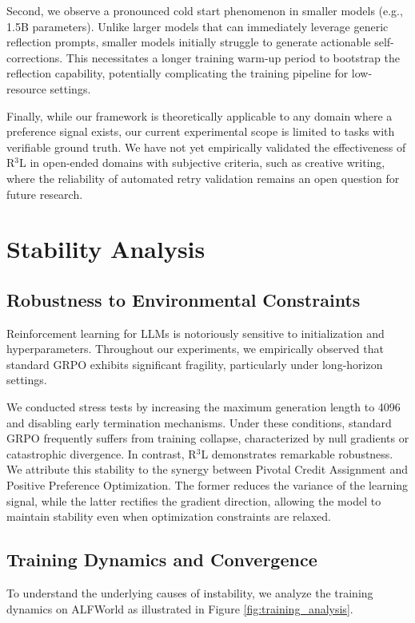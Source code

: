 \documentclass[11pt]{article}
\begin{document}
Second, we observe a pronounced cold start phenomenon in smaller models (e.g., 1.5B parameters). Unlike larger models that can immediately leverage generic reflection prompts, smaller models initially struggle to generate actionable self-corrections. This necessitates a longer training warm-up period to bootstrap the reflection capability, potentially complicating the training pipeline for low-resource settings.

Finally, while our framework is theoretically applicable to any domain where a preference signal exists, our current experimental scope is limited to tasks with verifiable ground truth. We have not yet empirically validated the effectiveness of R$^3$L in open-ended domains with subjective criteria, such as creative writing, where the reliability of automated retry validation remains an open question for future research.



\appendix

\section{Stability Analysis}

\label{sec:stability}

\subsection{Robustness to Environmental Constraints}
Reinforcement learning for LLMs is notoriously sensitive to initialization and hyperparameters. Throughout our experiments, we empirically observed that standard GRPO exhibits significant fragility, particularly under long-horizon settings.

We conducted stress tests by increasing the maximum generation length to 4096 and disabling early termination mechanisms. Under these conditions, standard GRPO frequently suffers from training collapse, characterized by null gradients or catastrophic divergence. In contrast, R$^3$L demonstrates remarkable robustness. We attribute this stability to the synergy between Pivotal Credit Assignment and Positive Preference Optimization. The former reduces the variance of the learning signal, while the latter rectifies the gradient direction, allowing the model to maintain stability even when optimization constraints are relaxed.

\subsection{Training Dynamics and Convergence}
\label{sec:training_dynamics}
To understand the underlying causes of instability, we analyze the training dynamics on ALFWorld as illustrated in Figure \ref{fig:training_analysis}.
\end{document}
